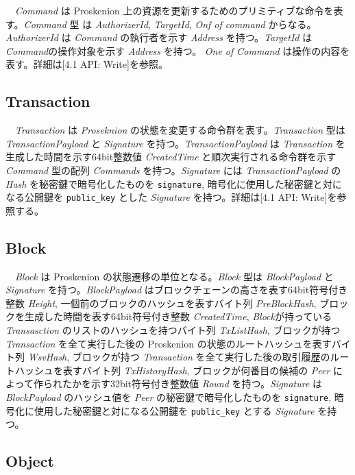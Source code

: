 　\emph{Command} は Proskenion
上の資源を更新するためのプリミティブな命令を表す。\emph{Command} 型 は
\emph{AuthorizerId}, \emph{TargetId}, \emph{Onf of command}
からなる。\emph{AuthorizerId} は \emph{Command} の執行者を示す
\emph{Address} を持つ。\emph{TargetId} は \emph{Command}の操作対象を示す
\emph{Address} を持つ。 \emph{One of Command}
は操作の内容を表す。詳細は{[}4.1 API: Write{]}を参照。

\hypertarget{transaction}{%
\subsection{Transaction}\label{transaction}}

　\emph{Transaction} は \emph{Proseknion}
の状態を変更する命令群を表す。\emph{Transaction} 型は
\emph{TransactionPayload} と \emph{Signature}
を持つ。\emph{TransactionPayload} は \emph{Transaction}
を生成した時間を示す64bit整数値 \emph{CreatedTime}
と順次実行される命令群を示す \emph{Command} 型の配列 \emph{Commands}
を持つ。\emph{Signature} には \emph{TransactionPayload} の \emph{Hash}
を秘密鍵で暗号化したものを \texttt{signature},
暗号化に使用した秘密鍵と対になる公開鍵を \texttt{public\_key} とした
\emph{Signature} を持つ。詳細は{[}4.1 API: Write{]}を参照する。

\hypertarget{block}{%
\subsection{Block}\label{block}}

　\emph{Block} は Proskenion の状態遷移の単位となる。\emph{Block} 型は
\emph{BlockPayload} と \emph{Signature} を持つ。\emph{BlockPayload}
はブロックチェーンの高さを表す64bit符号付き整数 \emph{Height},
一個前のブロックのハッシュを表すバイト列 \emph{PreBlockHash},
ブロックを生成した時間を表す64bit符号付き整数 \emph{CreatedTime},
\emph{Block}が持っている \emph{Transasction}
のリストのハッシュを持つバイト列 \emph{TxListHash}, ブロックが持つ
\emph{Transaction} を全て実行した後の Proskenion
の状態のルートハッシュを表すバイト列 \emph{WsvHash}, ブロックが持つ
\emph{Transaction}
を全て実行した後の取引履歴のルートハッシュを表すバイト列
\emph{TxHistoryHash}, ブロックが何番目の候補の \emph{Peer}
によって作られたかを示す32bit符号付き整数値 \emph{Round}
を持つ。\emph{Signature} は \emph{BlockPayload} のハッシュ値を
\emph{Peer} の秘密鍵で暗号化したものを \texttt{signature},
暗号化に使用した秘密鍵と対になる公開鍵を \texttt{public\_key} とする
\emph{Signature} を持つ。

\hypertarget{object}{%
\subsection{Object}\label{object}}


